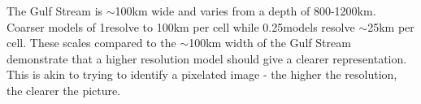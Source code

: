 \documentclass[..\EOYR.tex]{subfiles}
\begin{document}
The Gulf Stream is $\sim$100km wide and varies from a depth of 800-1200km. Coarser models of 1\degree resolve to 100km per cell while 0.25\degree models resolve $\sim$25km per cell. These scales compared to the $\sim$100km width of the Gulf Stream demonstrate that a higher resolution model should give a clearer representation. This is akin to trying to identify a pixelated image - the higher the resolution, the clearer the picture.
\end{document}
